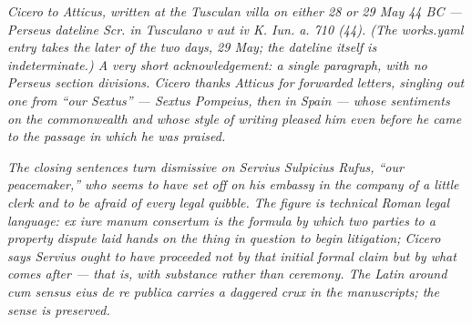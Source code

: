 
\textit{Cicero to Atticus, written at the Tusculan villa on
either 28 or 29 May 44 BC --- Perseus dateline \textit{Scr. in
Tusculano v aut iv K. Iun. a. 710 (44)}. (The works.yaml entry
takes the later of the two days, 29 May; the dateline itself is
indeterminate.) A very short acknowledgement: a single
paragraph, with no Perseus section divisions. Cicero thanks
Atticus for forwarded letters, singling out one from
``our Sextus'' --- Sextus Pompeius, then in Spain --- whose
sentiments on the commonwealth and whose style of writing
pleased him even before he came to the passage in which he was
praised.}

\textit{The closing sentences turn dismissive on Servius
Sulpicius Rufus, ``our peacemaker,'' who seems to have set off
on his embassy in the company of a little clerk and to be
afraid of every legal quibble. The figure is technical Roman
legal language: \textit{ex iure manum consertum} is the
formula by which two parties to a property dispute laid hands
on the thing in question to begin litigation; Cicero says
Servius ought to have proceeded not by that initial formal
claim but by what comes after --- that is, with substance
rather than ceremony. The Latin around \textit{cum sensus eius
de re publica} carries a daggered crux in the manuscripts; the
sense is preserved.}
